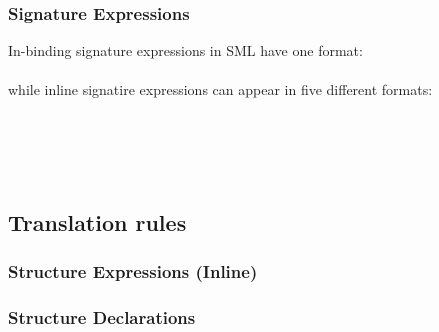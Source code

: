 \documentclass[a4paper,11pt]{article}
\begin{document}
\subsubsection{Signature Expressions}
In-binding signature expressions in SML have one format:\\
\\
while inline signatire expressions can appear in five different formats:\\
\\
\\
\\
\\
\subsection{Translation rules}
\subsubsection{Structure Expressions (Inline)}
\subsubsection{Structure Declarations}
\end{document}
